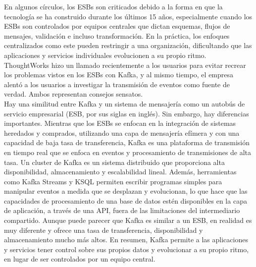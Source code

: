 \documentclass{article}
\begin{document}
En algunos círculos, los ESBs son criticados debido a la forma en que la tecnología se ha construido durante los últimos 15 años, especialmente cuando los ESBs son controlados por equipos centrales que dictan esquemas, flujos de mensajes, validación e incluso transformación. En la práctica, los enfoques centralizados como este pueden restringir a una organización, dificultando que las aplicaciones y servicios individuales evolucionen a su propio ritmo.\\

ThoughtWorks hizo un llamado recientemente a los usuarios para evitar recrear los problemas vistos en los ESBs con Kafka, y al mismo tiempo, el empresa alentó a los usuarios a investigar la transmisión de eventos como fuente de verdad. Ambos representan consejos sensatos.\\

Hay una similitud entre Kafka y un sistema de mensajería como un autobús de servicio empresarial (ESB, por sus siglas en inglés). Sin embargo, hay diferencias importantes. Mientras que los ESBs se enfocan en la integración de sistemas heredados y comprados, utilizando una capa de mensajería efímera y con una capacidad de baja tasa de transferencia, Kafka es una plataforma de transmisión en tiempo real que se enfoca en eventos y procesamiento de transmisiones de alta tasa. Un cluster de Kafka es un sistema distribuido que proporciona alta disponibilidad, almacenamiento y escalabilidad lineal. Además, herramientas como Kafka Streams y KSQL permiten escribir programas simples para manipular eventos a medida que se desplazan y evolucionan, lo que hace que las capacidades de procesamiento de una base de datos estén disponibles en la capa de aplicación, a través de una API, fuera de las limitaciones del intermediario compartido. Aunque puede parecer que Kafka es similar a un ESB, en realidad es muy diferente y ofrece una tasa de transferencia, disponibilidad y almacenamiento mucho más altos. En resumen, Kafka permite a las aplicaciones y servicios tener control sobre sus propios datos y evolucionar a su propio ritmo, en lugar de ser controlados por un equipo central.
\end{document}

